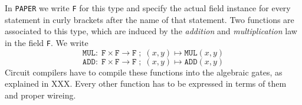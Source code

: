 In \texttt{PAPER} we write \texttt{F} for this type and specify the actual field instance for every statement in curly brackets after the name of that statement. Two functions are associated to this type, which are induced by the \textit{addition} and \textit{multiplication} law in the field \texttt{F}. We write
\begin{equation}
\mathtt{MUL}:\; \mathtt{F} \times \mathtt{F} \to \mathtt{F}\;;\; (x,y) \mapsto \mathtt{MUL}(x,y)
\end{equation}
\begin{equation}
\mathtt{ADD}:\; \mathtt{F} \times \mathtt{F} \to \mathtt{F}\;;\; (x,y) \mapsto \mathtt{ADD}(x,y)
\end{equation}
Circuit compilers have to compile these functions into the algebraic gates, as explained in XXX. Every other function has to be expressed in terms of them and proper wireing.


